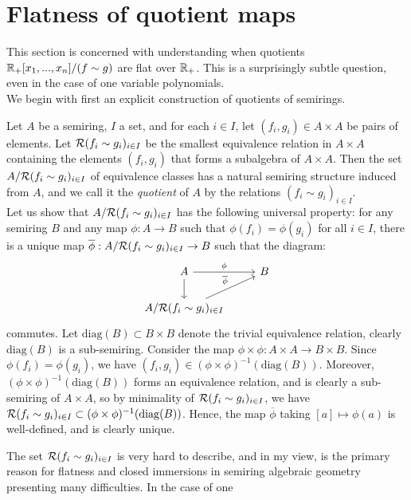 \section{Flatness of quotient maps}\label{sect:flatquot}
This section is concerned with understanding when quotients $\bb{R}_{+}[x_1,...,x_n]/(f \sim g)$ are flat over $\bb{R}_{+}$. 
This is a surprisingly subtle question, even in the case of one variable polynomials.\\
\indent We begin with first an explicit construction of quotients of semirings.
\begin{definition}
Let $A$ be a semiring, $I$ a set, and for each $i \in I$, let $(f_i,g_i) \in A \times A$ be pairs of elements.
Let $\cal{R}(f_i\sim g_i)_{i\in I}$ be the smallest equivalence relation in $A\times A$ containing the elements $(f_i,g_i)$ that forms a subalgebra of $A \times A$.
Then the set $A/\cal{R}(f_i\sim g_i)_{i\in I}$ of equivalence classes has a natural semiring structure induced from $A$, 
and we call it the \textit{quotient} of $A$ by the relations $(f_i \sim g_i)_{i \in I}$.\\
\indent Let us show that $A/\cal{R}(f_i\sim g_i)_{i\in I}$ has the following universal property: for any semiring $B$ and any map $\phi: A \to B$ such 
that $\phi(f_i) = \phi(g_i)$ for all $i \in I$, there is a unique map $\overline{\phi}: A/\cal{R}(f_i\sim g_i)_{i\in I} \to B$ such that the diagram:
\[\begin{tikzcd} A \arrow[r, "\phi"] \arrow[d] & B \\
    A/\cal{R}(f_i\sim g_i)_{i\in I} \arrow[ur, "\overline{\phi}"]  & 
\end{tikzcd}\]
commutes. Let $\mathrm{diag}(B) \subset B \times B$ denote the trivial equivalence relation, clearly $\mathrm{diag}(B)$ is a sub-semiring. Consider the map 
$\phi \times \phi: A \times A \to B \times B$. Since $\phi(f_i) = \phi(g_i)$, we have $(f_i,g_i) \in (\phi \times \phi)^{-1}(\mathrm{diag}(B))$.
Moreover, $(\phi \times \phi)^{-1}(\mathrm{diag}(B))$ forms an equivalence relation, and is clearly a sub-semiring of $A \times A$,
so by minimality of $\cal{R}(f_i\sim g_i)_{i\in I}$, we have $\cal{R}(f_i\sim g_i)_{i\in I} \subset (\phi \times \phi)^{-1}(\mathrm{diag}(B))$. 
Hence, the map $\overline{\phi}$ taking $[a] \mapsto \phi(a)$ is well-defined, 
and is clearly unique.
\end{definition}
The set $\cal{R}(f_i \sim g_i)_{i \in I}$ is very hard to describe, and in my view,
is the primary reason for flatness and closed immersions in semiring algebraic geometry presenting many difficulties. In the case of one 
